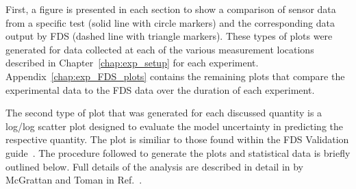 First, a figure is presented in each section to show a comparison of sensor data from a specific test (solid line with circle markers) and the corresponding data output by FDS (dashed line with triangle markers). These types of plots were generated for data collected at each of the various measurement locations described in Chapter~\ref{chap:exp_setup} for each experiment. Appendix~\ref{chap:exp_FDS_plots} contains the remaining plots that compare the experimental data to the FDS data over the duration of each experiment. 

The second type of plot that was generated for each discussed quantity is a log/log scatter plot designed to evaluate the model uncertainty in predicting the respective quantity. The plot is similiar to those found within the FDS Validation guide~\cite{FDS_Validation_Guide}. The procedure followed to generate the plots and statistical data is briefly outlined below. Full details of the analysis are described in detail in by McGrattan and Toman in Ref.~\cite{McGrattan:Metrologia}.

